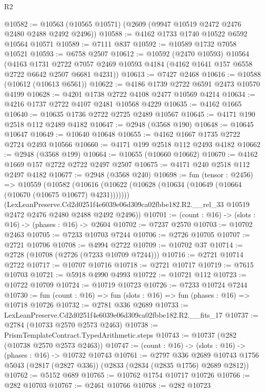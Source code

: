 \begin{lexlean}{R2}
\begin{coremodule}
@10582 := @10563 (@10565 @10571) (@2609 (@9947 @10519 @2472 @2476 @2480 @2488 @2492 @2496))
@10588 := @4162 @1733 @1740 @10522 @6592 @10564 @10571
@10589 := @7111 @837
@10592 := @10589 @1732 @7058 @10521
@10593 := @6758 @2507
@10612 := @10592
    (@2470 @10593)
    @10564
    (@4163
      @1731
      @2722
      @7057
      @2469
      @10593
      @4184
      (@4162 @1641 @157 @6558 @2722 @6642 @2507 @6681 @4231))
@10613 := @7427 @2468
@10616 := @10588 (@10612 (@10613 @6561))
@10622 := @4186 @1739 @2722 @6591 @2473 @10570 @4199
@10628 := @4201 @1738 @2722 @4108 @2477 @10569 @4214
@10634 := @4216 @1737 @2722 @4107 @2481 @10568 @4229
@10635 := @4162 @1665
@10640 := @10635 @1736 @2722 @2725 @2489 @10567
@10645 := @4171 @190 @2518 @112 @2489 @4182
@10647 := @2948 (@3568 @190)
@10648 := @10645 @10647
@10649 := @10640 @10648
@10655 := @4162 @1667 @1735 @2722 @2724 @2493 @10566
@10660 := @4171 @199 @2518 @112 @2493 @4182
@10662 := @2948 (@3568 @199)
@10664 := @10655 (@10660 @10662)
@10670 := @4162 @1669 @157 @2722 @2722 @2497 @2507
@10675 := @4171 @240 @2518 @112 @2497 @4182
@10677 := @2948 (@3568 @240)
@10698 := fun (tensor : @2456) =>
  @10559
    (@10582
      (@10616 (@10622 (@10628 (@10634 (@10649 (@10664 (@10670 (@10675 @10677) @4231)))))))
      (LexLeanPreserve.Cd2d0251f4e6039e06d309ca02fbbe182.R2.__rel_33
        @10519
        @2472
        @2476
        @2480
        @2488
        @2492
        @2496))
@10701 := (count : @16) -> (slots : @16) -> (phases : @16) -> @2604
@10702 := @7237 @2570
@10703 := @10702 @2463
@10705 := @7233 @10703 @7244
@10706 := @2726 @10705
@10707 := @2721 @10706
@10708 := @4994 @2722
@10709 := @10702 @37
@10714 := @2728 (@10708 (@2726 (@7233 @10709 @7244)))
@10716 := @2721 @10714 @2722
@10717 := @10707 @10716
@10718 := @2721 @10717
@10719 := @7615 @10703
@10721 := @5918 @4990 @4993
@10722 := @10721 @112
@10723 := @10722 @10709
@10724 := @10719 @10723
@10726 := @7233 @10724 @7244
@10730 := fun (count : @16) => fun (slots : @16) => fun (phases : @16) => @10718 @10726
@10732 := @2781 @336 @2689
@10733 := LexLeanPreserve.Cd2d0251f4e6039e06d309ca02fbbe182.R2.__fits_17
@10737 := @2784 (@10733 @2570 @2573 @2463)
@10738 := PrismTemplateContract.TypedArithmetic.steps
@10743 := @10737 (@282 (@10738 @2570 @2573 @2463))
@10747 := (count : @16) -> (slots : @16) -> (phases : @16) -> @10732 @10743
@10761 := @2797
    @336
    @2689
    @10743
    @1756
    @5043
    (@2817 (@2827 @336))
    (@2833 (@2834 (@2835 @1756) @2689 @2812))
@10762 := @5152 @689
@10765 := @10762 @1754 @10717 @10726
@10766 := @282 @10703
@10767 := @2461 @10766
@10768 := @282 @10723

\end{coremodule}
\end{lexlean}

